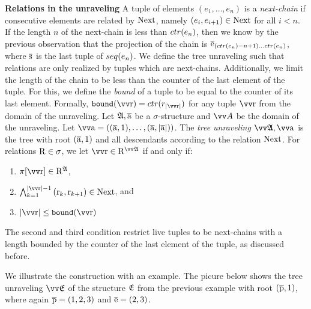 {\noindent
\textbf{Relations in the unraveling}
A tuple of elements $(e_{1}, \ldots, e_{n})$ is a \emph{next-chain} if consecutive elements are related by $\mathrm{Next}$, namely $(e_{i}, e_{i+1}) \in \mathrm{Next}$ for all $i < n$.
If the length $n$ of the next-chain is less than $\ctr{e_{n}}$, then we know by the previous observation that the projection of the chain is $\elemtuplee_{(\ctr{e_{n}}-n+1)\ldots{}\ctr{e_{n}}}$, where $\overline{\mathrm{s}}$ is the last tuple of $\seq{e_{n}}$.
We define the tree unraveling such that relations are only realized by tuples which are next-chains.
Additionally, we limit the length of the chain to be less than the counter of the last element of the tuple.
For this, we define the \emph{bound} of a tuple to be equal to the counter of its last element.
Formally, $\mathtt{bound}(\elemtuptupler) = \ctr{r_{|\elemtuptupler|}}$ for any tuple $\elemtuptupler$ from the domain of the unraveling.
Let ${\mathfrak{A}}, \overline{\mathrm{a}}$ be a $\sigma$-structure and $\unraveldom{A}$ be the domain of the unraveling.
Let $\elemtuptuplea = ((\elemtuplea, 1), \ldots, (\elemtuplea, |\elemtuplea|))$.
The \emph{tree unraveling} $\unravel{A}, \elemtuptuplea$ is the tree with root $(\overline{\mathrm{a}}, 1)$ and all descendants according to the relation $\mathrm{Next}$.
For relations $\mathrm{R} \in \sigma$, we let $\elemtuptupler \in \relR^{\unravel{A}}$ if and only if:\begin{enumerate}
  \item $\pi[\elemtuptupler] \in \relR^{\str{A}}$,
  \item $\bigwedge_{k=1}^{|\elemtuptupler|-1}{(\elemr_{k},\elemr_{k+1}) \in \relNext}$, and
  \item $|\elemtuptupler| \le \mathtt{bound}(\elemtuptupler)$
\end{enumerate}
The second and third condition restrict live tuples to be next-chains with a length bounded by the counter of the last element of the tuple, as discussed before.

We illustrate the construction with an example.
The picure below shows the tree unraveling $\unravel{E}$ of the structure ${\mathfrak{E}}$ from the previous example with root $(\overline{\mathrm{p}}, 1)$, where again $\overline{\mathrm{p}} = (1,2,3)$ and $\overline{\mathrm{e}} = (2,3)$.
\begin{figure}[H]
  \centering
  
\end{figure}

}
